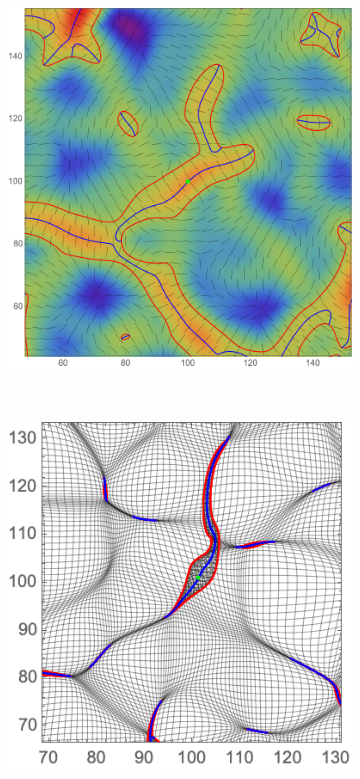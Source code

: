 \documentclass[a4paper, 11pt]{article}
\begin{document}
\begin{figure}
\begin{subfigure}[b]{0.4\textwidth}
\end{subfigure}\\
\begin{subfigure}[b]{0.4\textwidth}
\includegraphics[width=\textwidth]{Rotation_L_2}
\end{subfigure}~
\begin{subfigure}[b]{0.4\textwidth}
\includegraphics[width=\textwidth]{Rotation_Z_2}

\end{subfigure}
\end{figure}
\end{document}
